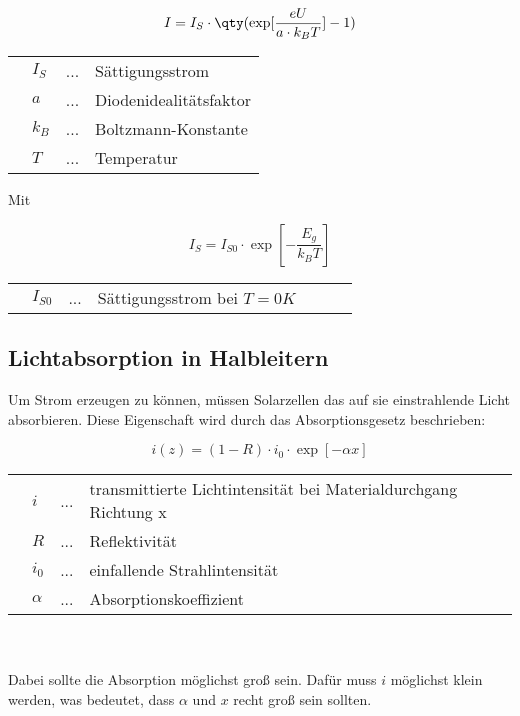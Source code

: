 \documentclass[slug=SZ, room=Hermann-Krone-Bau\,\ Labor\ 1.25, supervisor=Martin\ Kroll]{../../Lab_Report_LaTeX/lab_report}
\begin{document}
\begin{equation}\label{eq:shockley}
	I = I_S \cdot \qty(\exp[\frac{eU}{a \cdot k_B T}]-1)
\end{equation}

\begin{tabular}{llll}
	 & \(I_S\) & ... & Sättigungsstrom        \\
	 & \(a\)   & ... & Diodenidealitätsfaktor \\
	 & \(k_B\) & ... & Boltzmann-Konstante    \\
	 & \(T\)   & ... & Temperatur
\end{tabular}

\newpage

Mit

\begin{equation}\label{eq:sattigstrom}
	I_S = I_{S0} \cdot \exp[-\frac{E_g}{k_B T}]
\end{equation}

\begin{tabular}{lllllll}
	 & \(I_{S0}\) & ... & Sättigungsstrom bei \(T=0 K\) &
\end{tabular}

\subsection{Lichtabsorption in Halbleitern}
\label{sec:absorp}

Um Strom erzeugen zu können, müssen Solarzellen das auf sie einstrahlende Licht absorbieren.
Diese Eigenschaft wird durch das Absorptionsgesetz beschrieben:

\begin{equation}\label{eq:absorp}
	i(z) = (1-R) \cdot i_0 \cdot \exp[-\alpha x]
\end{equation}

\begin{tabular}{llll}
	 & \(i\)      & ... & transmittierte Lichtintensität bei Materialdurchgang Richtung x \\
	 & \(R\)      & ... & Reflektivität                                                   \\
	 & \(i_0\)    & ... & einfallende Strahlintensität                                    \\
	 & \(\alpha\) & ... & Absorptionskoeffizient
\end{tabular}\\ \\

Dabei sollte die Absorption möglichst groß sein. Dafür muss \(i\) möglichst klein werden, was bedeutet, dass
\(\alpha\) und \(x\) recht groß sein sollten.\\
\end{document}
